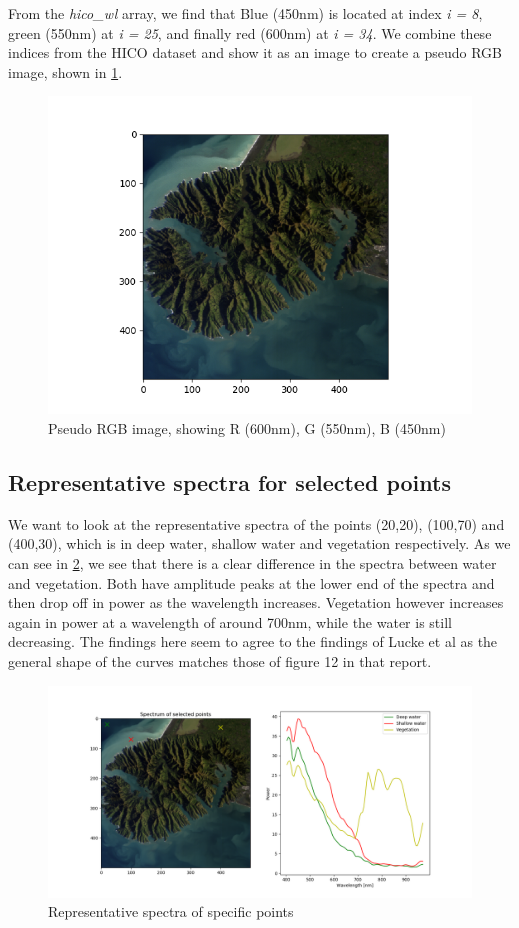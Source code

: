 From the \textit{hico\_wl} array, we find that Blue (450nm) is located at index \textit{i = 8}, 
green (550nm) at \textit{i = 25}, and finally red (600nm) at \textit{i = 34}. We combine these indices from 
the HICO dataset and show it as an image to create a pseudo RGB image, shown in \cref{fig:pseudo_rgb}.


\begin{figure}
    \centering
    \includegraphics[width=\textwidth]{../fig/pseudo_rgb.png}
    \caption{Pseudo RGB image, showing R (600nm), G (550nm), B (450nm)}
    \label{fig:pseudo_rgb}
\end{figure}

\subsection{Representative spectra for selected points}
\label{sec:representative_spec}

We want to look at the representative spectra of the points (20,20), (100,70) and (400,30), which is in deep water, shallow water 
and vegetation respectively.
As we can see in \cref{fig:point_spectra}, we see that there is a clear difference in the spectra between water and vegetation. 
Both have amplitude peaks at the lower end of the spectra and then drop off in power as the wavelength increases. Vegetation however increases
again in power at a wavelength of around 700nm, while the water is still decreasing. 
The findings here seem to agree to the findings of Lucke et al \cite{Lucke:11} as the general shape of the curves matches those of figure 12 in 
that report. 


\begin{figure}
    \centering
    \includegraphics[width=\textwidth]{../fig/pseudo_rgb_points.png}
    \caption{Representative spectra of specific points}
    \label{fig:point_spectra}
\end{figure}

